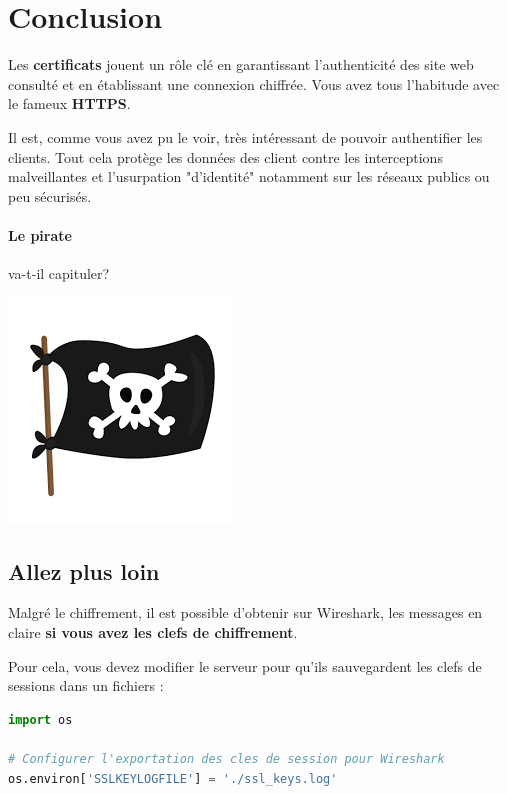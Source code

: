 \documentclass[french, 12pt]{article}%
\begin{document}
\normalcolor
\fi


\section{Conclusion}

\begin{minipage}{0.65\linewidth}
Les \textbf{certificats} jouent un rôle clé en garantissant l'authenticité des site web consulté et en établissant une connexion chiffrée. Vous avez tous l'habitude avec le fameux \textbf{HTTPS}. 

Il est, comme vous avez pu le voir, très intéressant de pouvoir authentifier les clients. Tout cela protège les données des client contre les interceptions malveillantes et l'usurpation "d'identité" notamment sur les réseaux publics ou peu sécurisés.

\paragraph{Le pirate} va-t-il capituler? 
\end{minipage}
\begin{minipage}{0.25\linewidth}
\begin{center}
\includegraphics[scale=0.4]{./ressource/logoHacker.png}
\end{center}
\end{minipage}


\subsection{Allez plus loin}

Malgré le chiffrement, il est possible d'obtenir sur Wireshark, les messages en claire \textbf{si vous avez les clefs de chiffrement}.

Pour cela, vous devez modifier le serveur pour qu'ils sauvegardent les clefs de sessions dans un fichiers : 
\begin{lstlisting}[style=commande, language=Python]
import os

# Configurer l'exportation des cles de session pour Wireshark
os.environ['SSLKEYLOGFILE'] = './ssl_keys.log'

\end{lstlisting}
\end{document}
